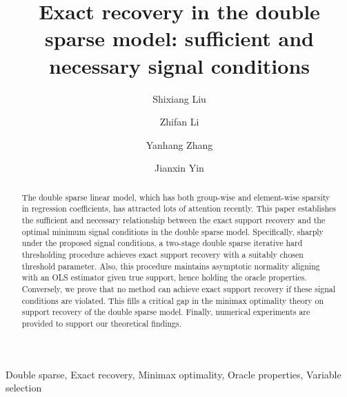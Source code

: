 \documentclass[12pt]{article}
\begin{document}
\title{Exact recovery in the double sparse model: sufficient and necessary signal conditions}

\author[1]{Shixiang Liu}
\author[2]{Zhifan Li}
\author[1]{Yanhang Zhang}
\author[1, 3]{Jianxin Yin}


\date{}
\maketitle \sloppy

\begin{abstract}
The double sparse linear model, which has both group-wise and element-wise sparsity in regression coefficients, has attracted lots of attention recently. 
This paper establishes the sufficient and necessary relationship between the exact support recovery and the optimal minimum signal conditions in the double sparse model. 
Specifically, sharply under the proposed signal conditions, a two-stage double sparse iterative hard thresholding procedure achieves exact support recovery with a suitably chosen threshold parameter.
Also, this procedure maintains asymptotic normality aligning with an OLS estimator given true support, hence holding the oracle properties.
Conversely, we prove that no method can achieve exact support recovery if these signal conditions are violated. 
This fills a critical gap in the minimax optimality theory on support recovery of the double sparse model.
Finally, numerical experiments are provided to support our theoretical findings.
\end{abstract}

\begin{keywords}
 {Double sparse}, {Exact recovery}, {Minimax optimality}, {Oracle properties}, {Variable selection}
\end{keywords}

 
\end{document}
